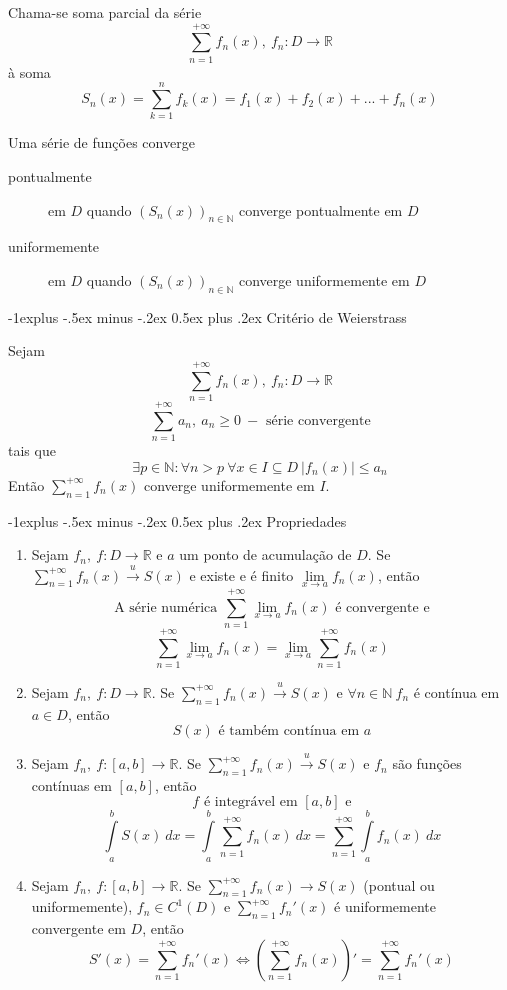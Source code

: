 \documentclass[10pt,landscape]{article}
\makeatletter
\renewcommand{\subsection}{\@startsection{subsection}{2}{0mm}%
                                {-1explus -.5ex minus -.2ex}%
                                {0.5ex plus .2ex}%
                                {\normalfont\normalsize\bfseries}}
\makeatother
\begin{document}
\begin{multicols}{3}
Chama-se soma parcial da série
$$\sum\limits_{n=1}^{+\infty} f_n(x),\ f_n: D \rightarrow \mathbb{R}$$
à soma
$$S_n(x) = \sum\limits_{k=1}^{n} f_k(x) = f_1(x) + f_2(x) + ... + f_n(x)$$

Uma série de funções converge
\begin{description}
\item[pontualmente] em $D$ quando $\left( S_n(x)\right)_{n \in \mathbb{N}}$ converge pontualmente em $D$
\item[uniformemente] em $D$ quando $\left( S_n(x)\right)_{n \in \mathbb{N}}$ converge uniformemente em $D$
\end{description}

\subsection{Critério de Weierstrass}

Sejam
$$\sum\limits_{n=1}^{+\infty} f_n(x),\ f_n: D \rightarrow \mathbb{R}$$
$$\sum\limits_{n=1}^{+\infty} a_n,\ a_n \geq 0\ - \text{ série convergente}$$
tais que
$$\exists p \in \mathbb{N}: \forall n > p\ \forall x \in I \subseteq D\ \left| f_n(x)\right| \leq a_n$$
Então $\sum\limits_{n=1}^{+\infty} f_n(x)$ converge uniformemente em $I$.

\subsection{Propriedades}

\begin{enumerate}
\item Sejam $f_n,\ f: D \rightarrow \mathbb{R}$ e $a$ um ponto de acumulação de $D$. Se $\sum\limits_{n=1}^{+\infty} f_n(x) \xrightarrow{u} S(x)$ e existe e é finito $\lim\limits_{x \to a} f_n(x)$, então
$$\text{A série numérica } \sum\limits_{n=1}^{+\infty} \lim\limits_{x \to a} f_n(x) \text{ é convergente e}$$
$$\sum\limits_{n=1}^{+\infty} \lim\limits_{x \to a} f_n(x) = \lim\limits_{x \to a}\sum\limits_{n=1}^{+\infty} f_n(x)$$
\item Sejam $f_n,\ f: D \rightarrow \mathbb{R}$. Se $\sum\limits_{n=1}^{+\infty} f_n(x) \xrightarrow{u} S(x)$ e $\forall n \in \mathbb{N}\ f_n$ é contínua em $a \in D$, então
$$S(x) \text{ é também contínua em } a$$
\item Sejam $f_n,\ f: [a, b] \rightarrow \mathbb{R}$. Se $\sum\limits_{n=1}^{+\infty} f_n(x) \xrightarrow{u} S(x)$ e $f_n$ são funções contínuas em $[a, b]$, então
$$f \text{ é integrável em } [a, b] \text{ e}$$
$$\int\limits_a^b S(x)\ dx = \int\limits_a^b \sum\limits_{n=1}^{+\infty} f_n(x)\ dx = \sum\limits_{n=1}^{+\infty} \int\limits_a^b f_n(x)\ dx$$
\item Sejam $f_n,\ f: [a, b] \rightarrow \mathbb{R}$. Se $\sum\limits_{n=1}^{+\infty} f_n(x) \rightarrow S(x)$ (pontual ou uniformemente), $f_n \in C^1(D)$ e $\sum\limits_{n=1}^{+\infty} f_n'(x)$ é uniformemente convergente em $D$, então
$$S'(x) = \sum\limits_{n=1}^{+\infty} f_n'(x) \Leftrightarrow \left( \sum\limits_{n=1}^{+\infty} f_n(x)\right)' = \sum\limits_{n=1}^{+\infty} f_n'(x)$$
\end{enumerate}


\end{multicols}
\end{document}
